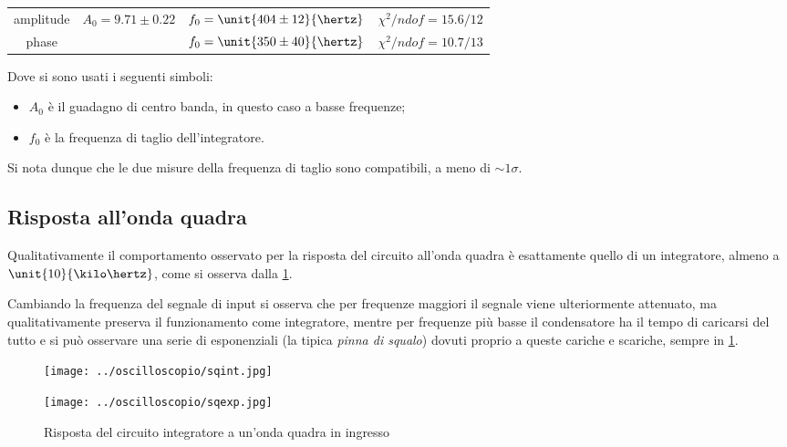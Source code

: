 \documentclass[10pt,a4paper]{article}
\begin{document}
\begin{table}[H]
\centering
\begin{tabular}{c|ccc}
amplitude	&	$A_0 = 9.71 \pm 0.22$	&	$f_0 = \unit{404 \pm 12}{\hertz}$	&	$\chi^2/ndof = 15.6 / 12$\\
phase		& &	$f_0 = \unit{350 \pm 40}{\hertz}$	&	$\chi^2/ndof = 10.7 / 13$
\end{tabular}
\end{table}

\noindent Dove si sono usati i seguenti simboli:
\begin{itemize}
\item $A_0$ è il guadagno di centro banda, in questo caso a basse frequenze;
\item $f_0$ è la frequenza di taglio dell'integratore.
\end{itemize}

Si nota dunque che le due misure della frequenza di taglio sono compatibili, a meno di $\sim 1\sigma$.

\subsection{Risposta all'onda quadra}

Qualitativamente il comportamento osservato per la risposta del circuito all'onda quadra è esattamente quello di un integratore, almeno a $\unit{10}{\kilo\hertz}$, come si osserva dalla \figurename{\ref{fig:intsq}}.

Cambiando la frequenza del segnale di input si osserva che per frequenze maggiori il segnale viene ulteriormente attenuato, ma qualitativamente preserva il funzionamento come integratore, mentre per frequenze più basse il condensatore ha il tempo di caricarsi del tutto e si può osservare una serie di esponenziali (la tipica \emph{pinna di squalo}) dovuti proprio a queste cariche e scariche, sempre in \figurename{\ref{fig:intsq}}.

\begin{figure}[H]
	\begin{minipage}[c]{0.49\textwidth}
		\centering
		\texttt{[image: ../oscilloscopio/sqint.jpg]}
	\end{minipage}
	\begin{minipage}[c]{0.49\textwidth}
		\centering
		\texttt{[image: ../oscilloscopio/sqexp.jpg]}
	\end{minipage}
	\caption{Risposta del circuito integratore a un'onda quadra in ingresso}
	\label{fig:intsq}
\end{figure}
\end{document}
